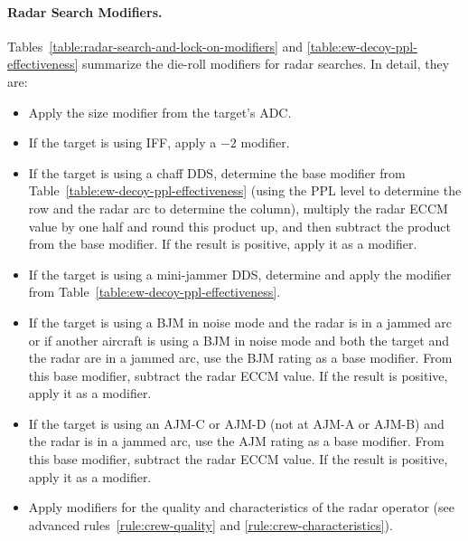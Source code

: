 {\paragraph{Radar Search Modifiers.} Tables~\ref{table:radar-search-and-lock-on-modifiers} and \ref{table:ew-decoy-ppl-effectiveness} summarize the die-roll modifiers for radar searches. In detail, they are:
\begin{itemize}
    \item Apply the size modifier from the target’s ADC.
    \item If the target is using IFF, apply a $-2$ modifier.
    \item If the target is using a chaff DDS, determine the base modifier from Table~\ref{table:ew-decoy-ppl-effectiveness} (using the PPL level to determine the row and the radar arc to determine the column), multiply the radar ECCM value by one half and round this product up, and then subtract the product from the base modifier. If the result is positive, apply it as a modifier.
    \item If the target is using a mini-jammer DDS, determine and apply the modifier from Table~\ref{table:ew-decoy-ppl-effectiveness}.
    \item If the target is using a BJM in noise mode and the radar is in a jammed arc or if another aircraft is using a BJM in noise mode and both the target and the radar are in a jammed arc, use the BJM rating as a base modifier. From this base modifier, subtract the radar ECCM value. If the result is positive, apply it as a modifier.
    \item If the target is using an AJM-C or AJM-D (not at AJM-A or AJM-B) and the radar is in a jammed arc, use the AJM rating as a base modifier. From this base modifier, subtract the radar ECCM value. If the result is positive, apply it as a modifier.
    \item Apply modifiers for the quality and characteristics of the radar operator (see advanced rules~\ref{rule:crew-quality} and \ref{rule:crew-characteristics}). 
\end{itemize}



}

